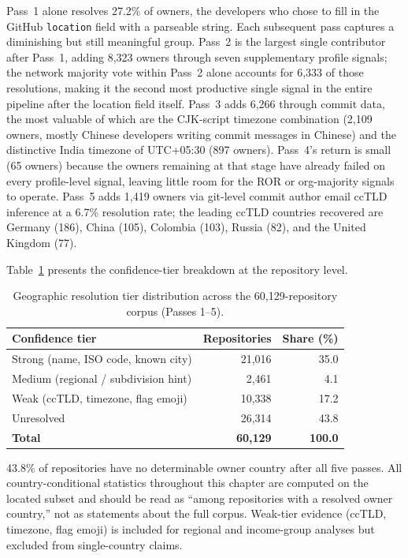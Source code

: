 Pass~1 alone resolves 27.2\% of owners, the developers who chose to fill in the GitHub \texttt{location} field with a parseable string. Each subsequent pass captures a diminishing but still meaningful group. Pass~2 is the largest single contributor after Pass~1, adding 8,323 owners through seven supplementary profile signals; the network majority vote within Pass~2 alone accounts for 6,333 of those resolutions, making it the second most productive single signal in the entire pipeline after the location field itself. Pass~3 adds 6,266 through commit data, the most valuable of which are the CJK-script timezone combination (2,109 owners, mostly Chinese developers writing commit messages in Chinese) and the distinctive India timezone of UTC+05:30 (897 owners). Pass~4's return is small (65 owners) because the owners remaining at that stage have already failed on every profile-level signal, leaving little room for the ROR or org-majority signals to operate. Pass~5 adds 1,419 owners via git-level commit author email ccTLD inference at a 6.7\% resolution rate; the leading ccTLD countries recovered are Germany (186), China (105), Colombia (103), Russia (82), and the United Kingdom (77).

Table~\ref{tab:geo_tiers} presents the confidence-tier breakdown at the repository level.

\begin{table}[h]
\centering
\caption{Geographic resolution tier distribution across the 60,129-repository corpus (Passes 1--5).}
\label{tab:geo_tiers}
\begin{tabular}{@{}lrr@{}}
\toprule
Confidence tier & Repositories & Share (\%) \\
\midrule
Strong (name, ISO code, known city) & 21,016 & 35.0 \\
Medium (regional / subdivision hint) &  2,461 &  4.1 \\
Weak (ccTLD, timezone, flag emoji)  & 10,338 & 17.2 \\
Unresolved                          & 26,314 & 43.8 \\
\midrule
\textbf{Total} & \textbf{60,129} & \textbf{100.0} \\
\bottomrule
\end{tabular}
\end{table}

43.8\% of repositories have no determinable owner country after all five passes. All country-conditional statistics throughout this chapter are computed on the located subset and should be read as ``among repositories with a resolved owner country,'' not as statements about the full corpus. Weak-tier evidence (ccTLD, timezone, flag emoji) is included for regional and income-group analyses but excluded from single-country claims.

